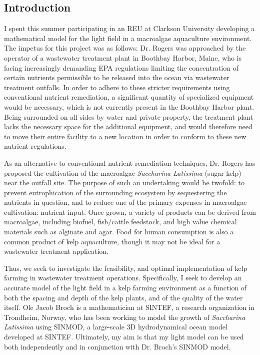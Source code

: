 \documentclass[10pt]{article}
\begin{document}
\begin{multicols}{2}

\section{Introduction}
I spent this summer participating in an REU at Clarkson University developing a mathematical model for the light field in a macroalgae aquaculture environment. The impetus for this project was as follows: Dr. Rogers was approached by the operator of a wastewater treatment plant in Boothbay Harbor, Maine, who is facing increasingly demanding EPA regulations limiting the concentration of certain nutrients permissible to be released into the ocean via wastewater treatment outfalls.
In order to adhere to these stricter requirements using conventional nutrient remediation, a significant quantity of specialized equipment would be necessary, which is not currently present in the Boothbay Harbor plant.
Being surrounded on all sides by water and private property, the treatment plant lacks the necessary space for the additional equipment, and would therefore need to move their entire facility to a new location in order to conform to these new nutrient regulations.

As an alternative to conventional nutrient remediation techniques, Dr. Rogers has proposed the cultivation of the macroalgae \textit{Saccharina Latissima} (sugar kelp) near the outfall site.
The purpose of such an undertaking would be twofold: to prevent eutrophication of the surrounding ecosystem by sequestering the nutrients in question, and to reduce one of the primary expenses in macroalgae cultivation: nutrient input.
Once grown, a variety of products can be derived from macroalgae, including biofuel, fish/cattle feedstock, and high value chemical materials such as alginate and agar.
Food for human consumption is also a common product of kelp aquaculture, though it may not be ideal for a wastewater treatment application.

Thus, we seek to investigate the feasibility, and optimal implementation of kelp farming in wastewater treatment operations. 
Specifically, I seek to develop an accurate model of the light field in a kelp farming environment as a function of both the spacing and depth of the kelp plants, and of the quality of the water itself.
Ole Jacob Broch is a mathematician at SINTEF, a research organization in Trondheim, Norway, who has been working to model the growth of \textit{Saccharina Latissima} using SINMOD, a large-scale 3D hydrodynamical ocean model developed at SINTEF.
Ultimately, my aim is that my light model can be used both independently and in conjunction with Dr. Broch's SINMOD model.


\end{multicols}
\end{document}

